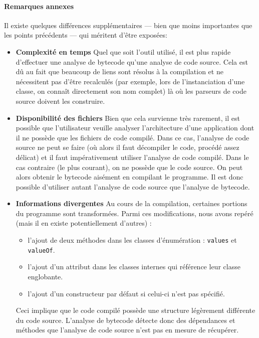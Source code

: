 \documentclass{scrartcl}
\begin{document}
        \paragraph{Remarques annexes}Il existe quelques différences supplémentaires --- bien que moins importantes que les points précédents --- qui méritent d'être exposées:
        \begin{itemize}
        	\item\textbf{Complexité en temps} Quel que soit l'outil utilisé, il est plus rapide d'effectuer une analyse de bytecode qu'une analyse de code source. Cela est dû au fait que beaucoup de liens sont résolus à la compilation et ne nécessitent pas d'être recalculés (par exemple, lors de l'instanciation d'une classe, on connaît directement son nom complet) là où les parseurs de code source doivent les construire.
        	\item\textbf{Disponibilité des fichiers} Bien que cela survienne très rarement, il est possible que l'utilisateur veuille analyser l'architecture d'une application dont il ne possède que les fichiers de code compilé. Dans ce cas, l'analyse de code source ne peut se faire (où alors il faut décompiler le code, procédé assez délicat) et il faut impérativement utiliser l'analyse de code compilé. Dans le cas contraire (le plus courant), on ne possède que le code source. On peut alors obtenir le bytecode aisément en compilant le programme. Il est donc possible d'utiliser autant l'analyse de code source que l'analyse de bytecode.
        	\item\textbf{Informations divergentes} Au cours de la compilation, certaines portions du programme sont transformées. Parmi ces modifications, nous avons repéré (mais il en existe potentiellement d'autres) :
        	\begin{itemize}
        	    \item l'ajout de deux méthodes dans les classes d'énumération : \texttt{values} et \texttt{valueOf}.
        	    \item l'ajout d'un attribut dans les classes internes qui référence leur classe englobante.
        	    \item l'ajout d'un constructeur par défaut si celui-ci n'est pas spécifié.
        	\end{itemize}
        	Ceci implique que le code compilé possède une structure légèrement différente du code source. L'analyse de bytecode détecte donc des dépendances et méthodes que l'analyse de code source n'est pas en mesure de récupérer.
        \end{itemize}
       
\end{document}
